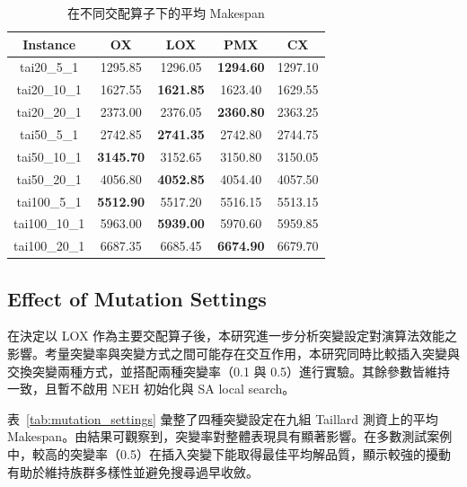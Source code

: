 \documentclass[conference]{IEEEtran}
\begin{document}
\begin{table}[H]
\centering
\caption{在不同交配算子下的平均 Makespan}
\label{tab:crossover_avg}
\begin{tabular}{c|c|c|c|c}
\hline
Instance & OX & LOX & PMX & CX \\
\hline
tai20\_5\_1   & 1295.85 & 1296.05 & \textbf{1294.60} & 1297.10 \\
tai20\_10\_1  & 1627.55 & \textbf{1621.85} & 1623.40 & 1629.55 \\
tai20\_20\_1  & 2373.00 & 2376.05 & \textbf{2360.80} & 2363.25 \\
tai50\_5\_1   & 2742.85 & \textbf{2741.35} & 2742.80 & 2744.75 \\
tai50\_10\_1  & \textbf{3145.70} & 3152.65 & 3150.80 & 3150.05 \\
tai50\_20\_1  & 4056.80 & \textbf{4052.85} & 4054.40 & 4057.50 \\
tai100\_5\_1  & \textbf{5512.90} & 5517.20 & 5516.15 & 5513.15 \\
tai100\_10\_1 & 5963.00 & \textbf{5939.00} & 5970.60 & 5959.85 \\
tai100\_20\_1 & 6687.35 & 6685.45 & \textbf{6674.90} & 6679.70 \\
\hline
\end{tabular}
\end{table}

\subsection{Effect of Mutation Settings}
在決定以 LOX 作為主要交配算子後，本研究進一步分析突變設定對演算法效能之影響。考量突變率與突變方式之間可能存在交互作用，本研究同時比較插入突變與交換突變兩種方式，並搭配兩種突變率（0.1 與 0.5）進行實驗。其餘參數皆維持一致，且暫不啟用 NEH 初始化與 SA local search。

表~\ref{tab:mutation_settings} 彙整了四種突變設定在九組 Taillard 測資上的平均 Makespan。由結果可觀察到，突變率對整體表現具有顯著影響。在多數測試案例中，較高的突變率（0.5）在插入突變下能取得最佳平均解品質，顯示較強的擾動有助於維持族群多樣性並避免搜尋過早收斂。
\end{document}
